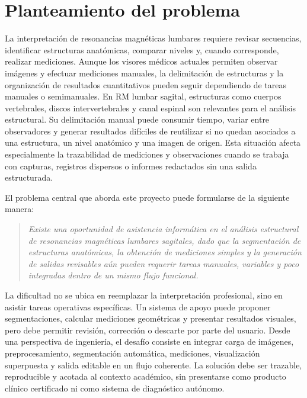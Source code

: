 \chapter{Planteamiento del problema}

La interpretaci\'on de resonancias magn\'eticas lumbares requiere revisar secuencias, identificar estructuras anat\'omicas, comparar niveles y, cuando corresponde, realizar mediciones. Aunque los visores m\'edicos actuales permiten observar im\'agenes y efectuar mediciones manuales, la delimitaci\'on de estructuras y la organizaci\'on de resultados cuantitativos pueden seguir dependiendo de tareas manuales o semimanuales. En RM lumbar sagital, estructuras como cuerpos vertebrales, discos intervertebrales y canal espinal son relevantes para el an\'alisis estructural. Su delimitaci\'on manual puede consumir tiempo, variar entre observadores y generar resultados dif\'iciles de reutilizar si no quedan asociados a una estructura, un nivel anat\'omico y una imagen de origen. Esta situaci\'on afecta especialmente la trazabilidad de mediciones y observaciones cuando se trabaja con capturas, registros dispersos o informes redactados sin una salida estructurada.

El problema central que aborda este proyecto puede formularse de la siguiente manera:

\begin{quote}
\itshape
Existe una oportunidad de asistencia inform\'atica en el an\'alisis estructural de resonancias magn\'eticas lumbares sagitales, dado que la segmentaci\'on de estructuras anat\'omicas, la obtenci\'on de mediciones simples y la generaci\'on de salidas revisables a\'un pueden requerir tareas manuales, variables y poco integradas dentro de un mismo flujo funcional.
\end{quote}

La dificultad no se ubica en reemplazar la interpretaci\'on profesional, sino en asistir tareas operativas espec\'ificas. Un sistema de apoyo puede proponer segmentaciones, calcular mediciones geom\'etricas y presentar resultados visuales, pero debe permitir revisi\'on, correcci\'on o descarte por parte del usuario. Desde una perspectiva de ingenier\'ia, el desaf\'io consiste en integrar carga de im\'agenes, preprocesamiento, segmentaci\'on autom\'atica, mediciones, visualizaci\'on superpuesta y salida editable en un flujo coherente. La soluci\'on debe ser trazable, reproducible y acotada al contexto acad\'emico, sin presentarse como producto cl\'inico certificado ni como sistema de diagn\'ostico aut\'onomo.
